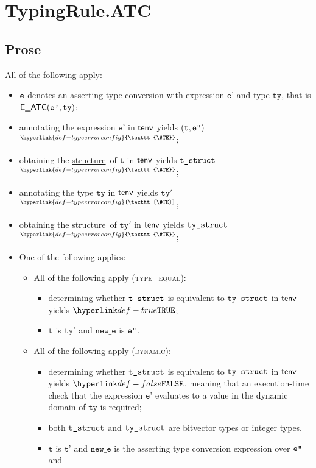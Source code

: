 \documentclass{book}
\newcommand\TypeErrorConfig[0]{\hyperlink{def-typeerrorconfig}{\texttt{\#TE}}}
\newcommand\ProseOrTypeError[0]{\hyperlink{def-proseortypeerror}{$^{\TypeErrorConfig}$}}
\newcommand\structure[0]{\hyperlink{def-structure}{structure}}
\newcommand\vt[0]{\texttt{t}}
\newcommand\tty[0]{\texttt{ty}}
\newcommand\newe[0]{\texttt{new\_e}}
\newcommand\vep[0]{\texttt{e'}}
\newcommand\vtp[0]{\texttt{t'}}
\begin{document}
\section{TypingRule.ATC \label{sec:TypingRule.ATC}}

\subsection{Prose}
All of the following apply:
\begin{itemize}
  \item $\texttt{e}$ denotes an asserting type conversion with expression $\vep$ and type $\tty$, that is $\EATC(\vep, \tty)$;
  \item annotating the expression $\vep$ in $\textsf{tenv}$ yields $(\vt, \vepp)$ \ProseOrTypeError;
  \item obtaining the \structure\ of $\vt$ in $\textsf{tenv}$ yields $\texttt{t\_struct}$ \ProseOrTypeError;
  \item annotating the type $\tty$ in $\textsf{tenv}$ yields $\tty'$ \ProseOrTypeError;
  \item obtaining the \structure\ of $\tty'$ in $\textsf{tenv}$ yields $\texttt{ty\_struct}$ \ProseOrTypeError;
  \item One of the following applies:
  \begin{itemize}
  \item All of the following apply (\textsc{type\_equal}):
  \begin{itemize}
    \item determining whether $\texttt{t\_struct}$ is equivalent to $\texttt{ty\_struct}$ in $\textsf{tenv}$ \\ yields $\True$;
    \item $\vt$ is $\tty'$ and $\newe$ is $\texttt{e''}$.
  \end{itemize}
  \item All of the following apply (\textsc{dynamic}):
    \begin{itemize}
      \item determining whether $\texttt{t\_struct}$ is equivalent to $\texttt{ty\_struct}$ in $\textsf{tenv}$ \\ yields $\False$,
      meaning that an execution-time check that the expression $\vep$ evaluates to a value in the
      dynamic domain of $\tty$ is required;
      \item both $\texttt{t\_struct}$ and $\texttt{ty\_struct}$ are bitvector types or integer types.
      \item $\vt$ is $\vtp$ and $\newe$ is the asserting type conversion expression over $\texttt{e''}$ \\ and

\end{itemize}
\end{itemize}
\end{itemize}
\end{document}
